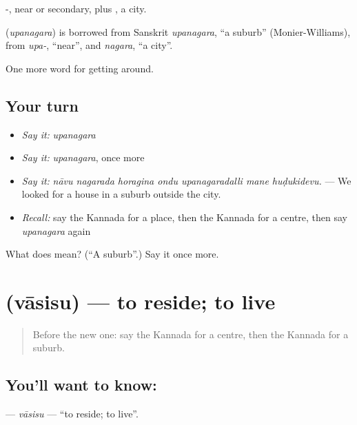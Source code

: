-, near or secondary, plus , a city.

\begin{cousinweb}
\textbf{} (\emph{upanagara}) is borrowed from Sanskrit \emph{upanagara}, \textquotedblleft{}a suburb\textquotedblright{} (Monier-Williams), from \emph{upa-}, \textquotedblleft{}near\textquotedblright{}, and \emph{nagara}, \textquotedblleft{}a city\textquotedblright{}.
\end{cousinweb}

\begin{grammarlens}[title={What you've built}]
One more word for getting around.
\end{grammarlens}

\subsection*{Your turn}
\begin{itemize}
\raggedright
  \item \emph{Say it:} \emph{upanagara}
  \item \emph{Say it:} \emph{upanagara}, once more
  \item \emph{Say it:} \emph{nāvu nagarada horagina ondu upanagaradalli mane huḍukidevu.} — We looked for a house in a suburb outside the city.
  \item \emph{Recall:} say the Kannada for a place, then the Kannada for a centre, then say \emph{upanagara} again
\end{itemize}

\begin{tcolorbox}[breakable,colback=teal!4,colframe=teal!35!black,title={Before you move on}]
What does  mean? (\textquotedblleft{}A suburb\textquotedblright{}.) Say it once more.
\end{tcolorbox}
\section[\texorpdfstring{\kn{ವಾಸಿಸು} (vāsisu)}{ವಾಸಿಸು (vāsisu)}]{ (vāsisu) — to reside; to live}

\label{lesson:KA-C466-vasisu}



\begin{quote}
Before the new one: say the Kannada for a centre, then the Kannada for a suburb.
\end{quote}

\subsection*{You'll want to know: }
\textbf{} — \emph{vāsisu} — \textquotedblleft{}to reside; to live\textquotedblright{}.

